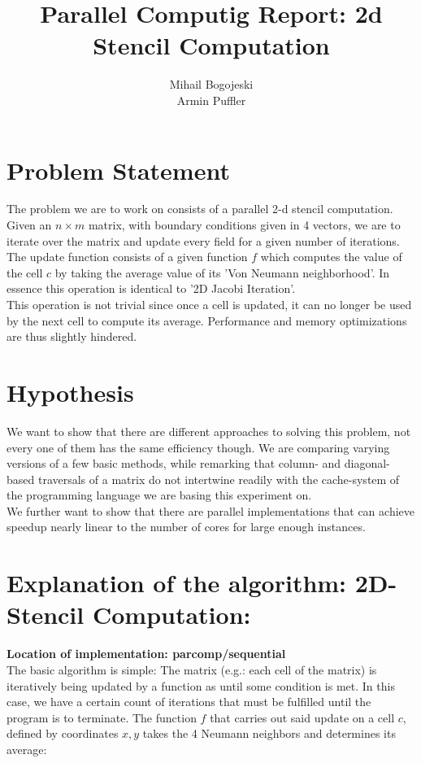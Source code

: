 \documentclass[11pt]{article}
\title{\textbf{Parallel Computig Report: 2d Stencil Computation}}
\author{Mihail Bogojeski\\
		Armin Puffler}
\date{}
\begin{document}
\maketitle

\section{Problem Statement}

The problem we are to work on consists of a parallel 2-d stencil computation.\\
Given an $n \times m$ matrix, with boundary conditions given in 4 vectors, we are to iterate over the matrix and update every field for a given number of iterations.\\ 
The update function consists of a given function $f$ which computes the value of the cell $c$ by taking the average value of its 'Von Neumann neighborhood'. In essence this operation is identical to '2D Jacobi Iteration'.\\
This operation is not trivial since once a cell is updated, it can no longer be used by the next cell to compute its average. Performance and memory optimizations are thus slightly hindered.\\
 
\section{Hypothesis}

We want to show that there are different approaches to solving this problem, not every one of them has the same efficiency though. We are comparing varying versions of a few basic methods, while remarking that column- and diagonal-based traversals of a matrix do not intertwine readily with the cache-system of the programming language we are basing this experiment on.\\
We further want to show that there are parallel implementations that can achieve speedup nearly linear to the number of cores for large enough instances.

\section{Explanation of the algorithm: 2D-Stencil Computation: }
\textbf{Location of implementation: parcomp/sequential}\\
The basic algorithm is simple: The matrix (e.g.: each cell of the matrix) is iteratively being updated by a function as until some condition is met. In this case, we have a certain count of iterations that must be fulfilled until the program is to terminate.
The function $f$ that carries out said update on a cell $c$, defined by coordinates $x, y$ takes the 4 Neumann neighbors and determines its average:
\end{document}
